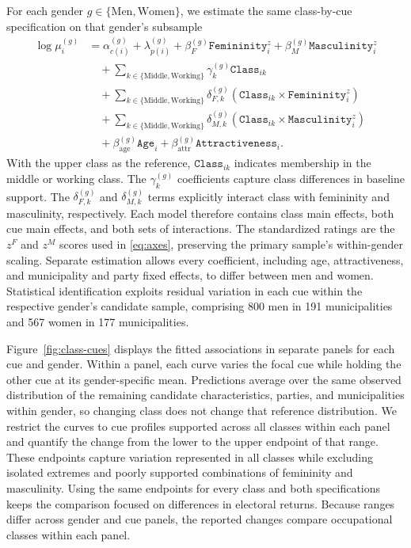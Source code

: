 \documentclass[11pt,a4paper]{article}\usepackage[]{graphicx}\usepackage[]{xcolor}
\begin{document}
For each gender $g\in\{\mathrm{Men},\mathrm{Women}\}$, we estimate the same class-by-cue specification on that gender's subsample
\begin{equation}
\begin{aligned}
\log\mu_i^{(g)}
 &= \alpha_{c(i)}^{(g)}+\lambda_{p(i)}^{(g)}
 +\beta_F^{(g)}\texttt{Femininity}_i^{z}
 +\beta_M^{(g)}\texttt{Masculinity}_i^{z}
 \\[-0.1em]
 &\quad+\sum_{k\in\{\mathrm{Middle},\mathrm{Working}\}}
 \gamma_k^{(g)}\texttt{Class}_{ik}
 \\[-0.1em]
 &\quad+\sum_{k\in\{\mathrm{Middle},\mathrm{Working}\}}
 \delta_{F,k}^{(g)}
 (\texttt{Class}_{ik}\times\texttt{Femininity}_i^{z})
 \\[-0.1em]
 &\quad+\sum_{k\in\{\mathrm{Middle},\mathrm{Working}\}}
 \delta_{M,k}^{(g)}
 (\texttt{Class}_{ik}\times\texttt{Masculinity}_i^{z})
 \\[-0.1em]
 &\quad+\beta_{\mathrm{age}}^{(g)}\texttt{Age}_i
 +\beta_{\mathrm{attr}}^{(g)}\texttt{Attractiveness}_i.
\end{aligned}
\label{eq:class-model}
\end{equation}
With the upper class as the reference, $\texttt{Class}_{ik}$ indicates membership in the middle or working class. The $\gamma_k^{(g)}$ coefficients capture class differences in baseline support. The $\delta_{F,k}^{(g)}$ and $\delta_{M,k}^{(g)}$ terms explicitly interact class with femininity and masculinity, respectively. Each model therefore contains class main effects, both cue main effects, and both sets of interactions. The standardized ratings are the $z^F$ and $z^M$ scores used in \autoref{eq:axes}, preserving the primary sample's within-gender scaling. Separate estimation allows every coefficient, including age, attractiveness, and municipality and party fixed effects, to differ between men and women. Statistical identification exploits residual variation in each cue within the respective gender's candidate sample, comprising 800 men in 191 municipalities and 567 women in 177 municipalities.

Figure~\ref{fig:class-cues} displays the fitted associations in separate panels for each cue and gender. Within a panel, each curve varies the focal cue while holding the other cue at its gender-specific mean. Predictions average over the same observed distribution of the remaining candidate characteristics, parties, and municipalities within gender, so changing class does not change that reference distribution. We restrict the curves to cue profiles supported across all classes within each panel and quantify the change from the lower to the upper endpoint of that range. These endpoints capture variation represented in all classes while excluding isolated extremes and poorly supported combinations of femininity and masculinity. Using the same endpoints for every class and both specifications keeps the comparison focused on differences in electoral returns. Because ranges differ across gender and cue panels, the reported changes compare occupational classes within each panel.
\end{document}
